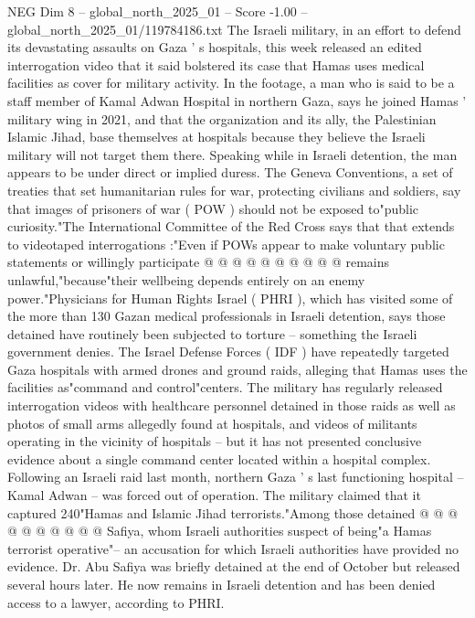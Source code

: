 \begin{textsample}{NEG Dim 8 – global\_north\_2025\_01 – Score -1.00 – global\_north\_2025\_01/119784186.txt}  \label{ex:f8_neg_339}
The Israeli military, in an effort to defend its devastating assaults on Gaza ' s hospitals, this week released an edited interrogation video that it said bolstered its case that Hamas uses medical facilities as cover for military activity.
In the footage, a man who is said to be a staff member of Kamal Adwan Hospital in northern Gaza, says he joined Hamas ' military wing in 2021, and that the organization and its ally, the Palestinian Islamic Jihad, base themselves at hospitals because they believe the Israeli military will not target them there.
Speaking while in Israeli detention, the man appears to be under direct or implied duress.
The Geneva Conventions, a set of treaties that set humanitarian rules for war, protecting civilians and soldiers, say that images of prisoners of war ( POW ) should not be exposed to"public curiosity."The International Committee of the Red Cross says that that extends to videotaped interrogations :"Even if POWs appear to make voluntary public statements or willingly participate @ @ @ @ @ @ @ @ @ @ remains unlawful,"because"their wellbeing depends entirely on an enemy power."Physicians for Human Rights Israel ( PHRI ), which has visited some of the more than 130 Gazan medical professionals in Israeli detention, says those detained have routinely been subjected to torture -- something the Israeli government denies.
The Israel Defense Forces ( IDF ) have repeatedly targeted Gaza hospitals with armed drones and ground raids, alleging that Hamas uses the facilities as"command and control"centers.
The military has regularly released interrogation videos with healthcare personnel detained in those raids as well as photos of small arms allegedly found at hospitals, and videos of militants operating in the vicinity of hospitals -- but it has not presented conclusive evidence about a single command center located within a hospital complex.
Following an Israeli raid last month, northern Gaza ' s last functioning hospital -- Kamal Adwan -- was forced out of operation.
The military claimed that it captured 240"Hamas and Islamic Jihad terrorists."Among those detained @ @ @ @ @ @ @ @ @ @ Safiya, whom Israeli authorities suspect of being"a Hamas terrorist operative"-- an accusation for which Israeli authorities have provided no evidence.
Dr.
Abu Safiya was briefly detained at the end of October but released several hours later.
He now remains in Israeli detention and has been denied access to a lawyer, according to PHRI.

\end{textsample}
